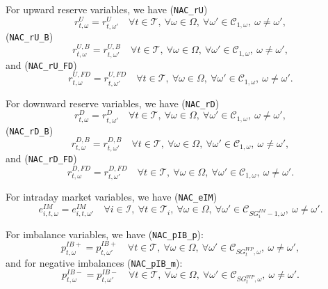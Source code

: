 \documentclass{article}
\begin{document}
For upward reserve variables, we have (\verb|NAC_rU|)
\begin{equation} \label{EQ:NAC_pVRU}
	r^U_{t, \omega} = r^U_{t, \omega'} \quad \forall t \in \mathcal{T}, \ \forall \omega \in \Omega, \ \forall \omega' \in \mathcal{C}_{1, \omega}, \ \omega \neq \omega',
\end{equation}
(\verb|NAC_rU_B|)
\begin{equation} \label{EQ:NAC_rUB}
	r^{U, B}_{t, \omega} = r^{U, B}_{t, \omega'} \quad \forall t \in \mathcal{T}, \ \forall \omega \in \Omega, \ \forall \omega' \in \mathcal{C}_{1, \omega}, \ \omega \neq \omega',
\end{equation}
and (\verb|NAC_rU_FD|)
\begin{equation} \label{EQ:NAC_rUFD}
	r^{U, FD}_{t, \omega} = r^{U, FD}_{t, \omega'} \quad \forall t \in \mathcal{T}, \ \forall \omega \in \Omega, \ \forall \omega' \in \mathcal{C}_{1, \omega}, \ \omega \neq \omega'.
\end{equation}

For downward reserve variables, we have (\verb|NAC_rD|)
\begin{equation} \label{EQ:NAC_pVRD}
	r^D_{t, \omega} = r^D_{t, \omega'} \quad \forall t \in \mathcal{T}, \ \forall \omega \in \Omega, \ \forall \omega' \in \mathcal{C}_{1, \omega}, \ \omega \neq \omega',
\end{equation}
(\verb|NAC_rD_B|)
\begin{equation} \label{EQ:NAC_rDB}
	r^{D, B}_{t, \omega} = r^{D, B}_{t, \omega'} \quad \forall t \in \mathcal{T}, \ \forall \omega \in \Omega, \ \forall \omega' \in \mathcal{C}_{1, \omega}, \ \omega \neq \omega',
\end{equation}
and (\verb|NAC_rD_FD|)
\begin{equation} \label{EQ:NAC_rDFD}
	r^{D, FD}_{t, \omega} = r^{D, FD}_{t, \omega'} \quad \forall t \in \mathcal{T}, \ \forall \omega \in \Omega, \ \forall \omega' \in \mathcal{C}_{1, \omega}, \ \omega \neq \omega'.
\end{equation}


For intraday market variables, we have (\verb|NAC_eIM|)
\begin{equation} \label{EQ:NAC_mUC}
	e^{IM}_{i, t, \omega} = e^{IM}_{i, t, \omega'} \quad \forall i \in \mathcal{I}, \ \forall t \in \mathcal{T}_i, \ \forall \omega \in \Omega, \ \forall \omega' \in \mathcal{C}_{SG^{IM}_i -1, \omega}, \ \omega \neq \omega'.
\end{equation}


For imbalance variables, we have (\verb|NAC_pIB_p|):
\begin{equation} \label{EQ:NAC_pPIB}
	p^{IB+}_{t, \omega} = p^{IB+}_{t, \omega'} \quad \forall t \in \mathcal{T}, \ \forall \omega \in \Omega, \ \forall \omega' \in \mathcal{C}_{SG^{WP}_t, \omega}, \ \omega \neq \omega',
\end{equation}
and for negative imbalances (\verb|NAC_pIB_m|):
\begin{equation} \label{EQ:NAC_pNIB}
	p^{IB-}_{t, \omega} = p^{IB-}_{t, \omega'} \quad \forall t \in \mathcal{T}, \ \forall \omega \in \Omega, \ \forall \omega' \in \mathcal{C}_{SG^{WP}_t, \omega}, \ \omega \neq \omega'.
\end{equation}
\end{document}
